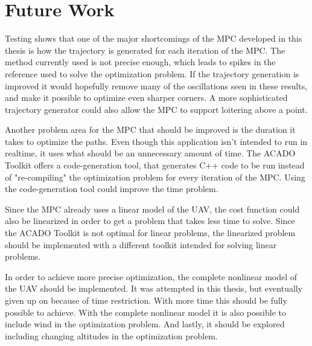 
\section{Future Work}

Testing shows that one of the major shortcomings of the MPC developed in this thesis is how the trajectory is generated for each iteration of the MPC. The method currently used is not precise enough, which leads to spikes in the reference used to solve the optimization problem. If the trajectory generation is improved it would hopefully remove many of the oscillations seen in these results, and make it possible to optimize even sharper corners. A more sophisticated trajectory generator could also allow the MPC to support loitering above a point.

Another problem area for the MPC that should be improved is the duration it takes to optimize the paths. Even though this application isn't intended to run in realtime, it uses what should be an unnecessary amount of time. The ACADO Toolkit offers a code-generation tool, that generates C++ code to be run instead of "re-compiling" the optimization problem for every iteration of the MPC. Using the code-generation tool could improve the time problem.

Since the MPC already uses a linear model of the UAV, the cost function could also be linearized in order to get a problem that takes less time to solve. Since the ACADO Toolkit is not optimal for linear problems, the linearized problem should be implemented with a different toolkit intended for solving linear problems.

In order to achieve more precise optimization, the complete nonlinear model of the UAV should be implemented. It was attempted in this thesis, but eventually given up on because of time restriction. With more time this should be fully possible to achieve. With the complete nonlinear model it is also possible to include wind in the optimization problem. And lastly, it should be explored including changing altitudes in the optimization problem.